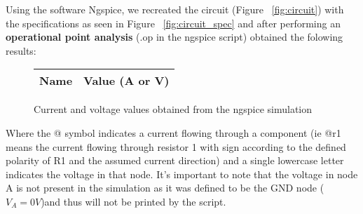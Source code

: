 \label{simulation}
\hspace{12pt} Using the software Ngspice, we recreated the circuit (Figure ~\ref{fig:circuit}) with the specifications as seen in Figure ~\ref{fig:circuit_spec} and after performing an \textbf{operational point analysis} (.op in the ngspice script) obtained the folowing results:

\begin{figure}[h]
	\begin{center}
		\begin{tabular}{|c|c|}
			\hline
			\textbf{Name} & \textbf{Value (A or V)} \\
			\hline
			
		\end{tabular}
	\end{center}
	\caption{Current and voltage values obtained from the ngspice simulation}
	\label{sim_results}
\end{figure}

Where the @ symbol indicates a current flowing through a component (ie @r1 means the current flowing through resistor 1 with sign according to the defined polarity of R1 and the assumed current direction) and a single lowercase letter indicates the voltage in that node. It's important to note that the voltage in node A is not present in the simulation as it was defined to be the GND node ($V_A = 0V$)and thus will not be printed by the script.


